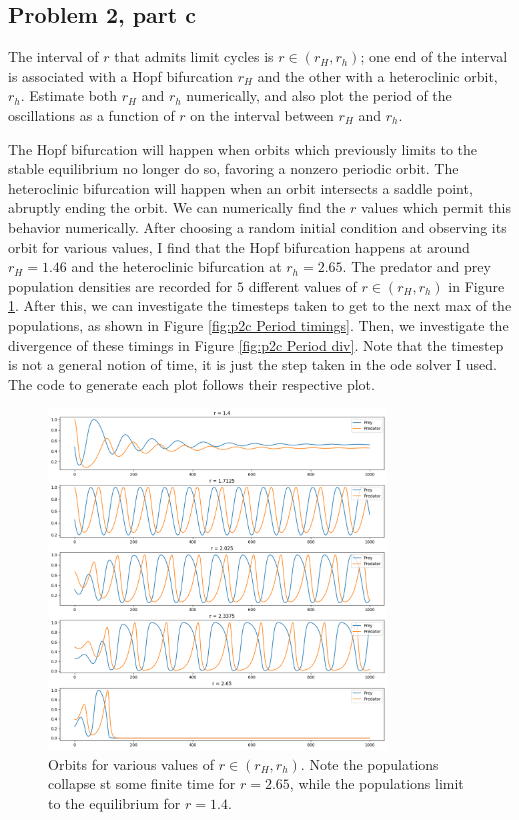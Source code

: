 \subsection{Problem 2, part c}
The interval of $r$ that admits limit cycles is $r \in (r_H, r_h)$; one end of the interval is associated with a Hopf bifurcation $r_H$ and the other with a heteroclinic orbit, $r_h$. Estimate both $r_H$ and $r_h$ numerically, and also plot the period of the oscillations as a function of $r$ on the interval between $r_H$ and $r_h$. 
\partbreak
\begin{solution}

    The Hopf bifurcation will happen when orbits which previously limits to the stable equilibrium no longer do so, favoring a nonzero periodic orbit. The heteroclinic bifurcation will happen when an orbit intersects a saddle point, abruptly ending the orbit. We can numerically find the $r$ values which permit this behavior numerically. After choosing a random initial condition and observing its orbit for various values, I find that the Hopf bifurcation happens at around $ r_H = 1.46$ and the heteroclinic bifurcation at $r_h = 2.65$. The predator and prey population densities are recorded for $5$ different values of $r \in (r_H, r_h)$ in Figure \ref{fig:p2c orbits}. After this, we can investigate the timesteps taken to get to the next max of the populations, as shown in Figure \ref{fig:p2c Period timings}. Then, we investigate the divergence of these timings in Figure \ref{fig:p2c Period div}. Note that the timestep is not a general notion of time, it is just the step taken in the ode solver I used. The code to generate each plot follows their respective plot.

    \begin{figure}
        \centering
        \includegraphics[width = 0.8\textwidth]{Images/Orbits for different r.png}
        \caption{Orbits for various values of $r \in (r_H, r_h)$. Note the populations collapse st some finite time for $r = 2.65$, while the populations limit to the equilibrium for $r = 1.4.$}
        \label{fig:p2c orbits}
    \end{figure}


\end{solution}
